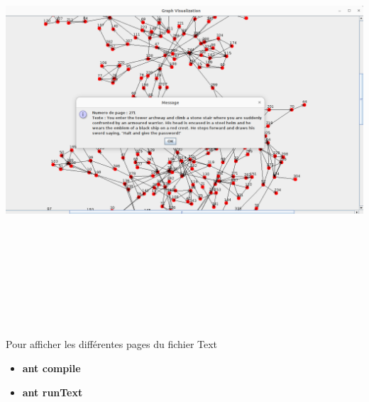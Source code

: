 \documentclass[12pt]{article}
\begin{document}
\includegraphics[width=16cm,height=16cm]{images/rendu2.png}

\vspace{12pt plus 5pt minus 5pt}

Pour afficher les différentes pages du fichier Text

\begin{itemize}
 \item \textbf{ant compile}
 \item \textbf{ant runText}
 
\end{itemize}
\end{document}
